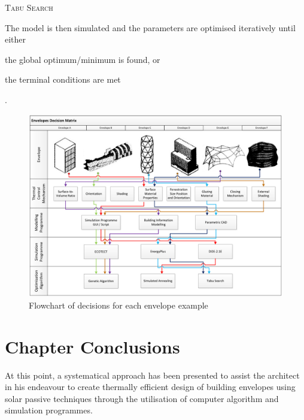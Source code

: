 \begin{compactenum}
\item \textsc{Tabu Search}
\end{compactenum}

The model is then simulated and the parameters are optimised iteratively until either \begin{inparaenum}[a)]\item the global optimum/minimum is found, or \item the terminal conditions are met\end{inparaenum}.


\begin{figure}
	\centering
	\includegraphics[width=\textheight]{./Images/24-DecisionChart}
	\caption[Decision Flowchart]{Flowchart of decisions for each envelope example}
	\label{fig:DecisionChart}
\end{figure}

\clearpage
\section{Chapter Conclusions}

At this point, a systematical approach has been presented to assist the architect in his endeavour to create thermally efficient design of building envelopes using solar passive techniques through the utilisation of computer algorithm and simulation programmes.

